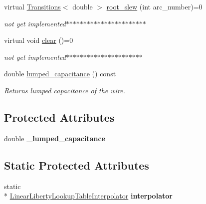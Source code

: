 \begin{DoxyCompactItemize}
virtual \hyperlink{classTransitions}{Transitions}$<$ double $>$ \hyperlink{classWireDelayModel_a9e5344c26b73f549a2b5c38fea8af13d}{root\-\_\-slew} (int arc\-\_\-number)=0
\begin{DoxyCompactList}\small\item\em not yet implemented$\ast$$\ast$$\ast$$\ast$$\ast$$\ast$$\ast$$\ast$$\ast$$\ast$$\ast$$\ast$$\ast$$\ast$$\ast$$\ast$$\ast$$\ast$$\ast$$\ast$$\ast$$\ast$$\ast$ \end{DoxyCompactList}\item 
virtual void \hyperlink{classWireDelayModel_a74869a3a66deb53507e8bc6f16eff45c}{clear} ()=0
\begin{DoxyCompactList}\small\item\em not yet implemented$\ast$$\ast$$\ast$$\ast$$\ast$$\ast$$\ast$$\ast$$\ast$$\ast$$\ast$$\ast$$\ast$$\ast$$\ast$$\ast$$\ast$$\ast$$\ast$$\ast$$\ast$$\ast$ \end{DoxyCompactList}\item 
double \hyperlink{classWireDelayModel_a05f509843dfa07e17c9b6cc16ba9aaa0}{lumped\-\_\-capacitance} () const 
\begin{DoxyCompactList}\small\item\em Returns lumped capacitance of the wire. \end{DoxyCompactList}\end{DoxyCompactItemize}
\subsection*{Protected Attributes}
\begin{DoxyCompactItemize}
\item 
\hypertarget{classWireDelayModel_ab03b1640710e81c9dcd4cbe9b7fed329}{double {\bfseries \-\_\-lumped\-\_\-capacitance}}\label{classWireDelayModel_ab03b1640710e81c9dcd4cbe9b7fed329}

\end{DoxyCompactItemize}
\subsection*{Static Protected Attributes}
\begin{DoxyCompactItemize}
\item 
\hypertarget{classWireDelayModel_aa8f767316492b902c13ec68651b30247}{static \\*
\hyperlink{classLinearLibertyLookupTableInterpolator}{Linear\-Liberty\-Lookup\-Table\-Interpolator} {\bfseries interpolator}}\label{classWireDelayModel_aa8f767316492b902c13ec68651b30247}

\end{DoxyCompactItemize}


